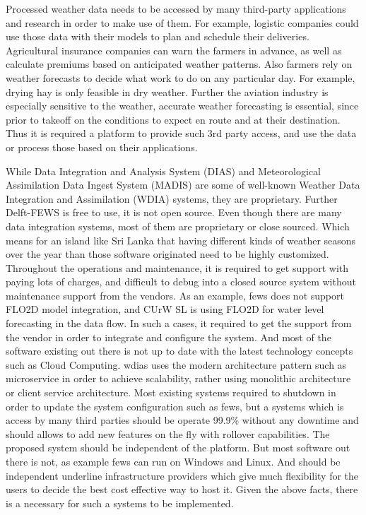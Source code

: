 Processed weather data needs to be accessed by many third-party applications and research in order to make use of them. For example, logistic companies could use those data with their models to plan and schedule their deliveries. Agricultural insurance companies can warn the farmers in advance, as well as calculate premiums based on anticipated weather patterns. Also farmers rely on weather forecasts to decide what work to do on any particular day. For example, drying hay is only feasible in dry weather. Further the aviation industry is especially sensitive to the weather, accurate weather forecasting is essential, since prior to takeoff on the conditions to expect en route and at their destination. 
Thus it is required a platform to provide such 3rd party access, and use the data or process those based on their applications.

While Data Integration and Analysis System (DIAS) and Meteorological Assimilation Data Ingest System (MADIS) are some of well-known Weather Data Integration and Assimilation (WDIA) systems, they are proprietary. Further Delft-FEWS is free to use, it is not open source.
Even though there are many data integration systems, most of them are proprietary or close sourced. Which means for an island like Sri Lanka that having different kinds of weather seasons over the year than those software originated need to be highly customized. Throughout the operations and maintenance, it is required to get support with paying lots of charges, and difficult to debug into a closed source system without maintenance support from the vendors. As an example, \acrshort{fews} does not support FLO2D model integration, and CUrW SL is using FLO2D for water level forecasting in the data flow. In such a cases, it required to get the support from the vendor in order to integrate and configure the system.
And most of the software existing out there is not up to date with the latest technology concepts such as Cloud Computing. \acrfull{wdias} uses the modern architecture pattern such as microservice in order to achieve scalability, rather using monolithic architecture or client service architecture. Most existing systems required to shutdown in order to update the system configuration such as \acrshort{fews}, but a systems which is access by many third parties should be operate 99.9\% without any downtime and should allows to add new features on the fly with rollover capabilities. The proposed system should be independent of the platform. But most software out there is not, as example \acrshort{fews} can run on Windows and Linux. And should be independent underline infrastructure providers which give much flexibility for the users to decide the best cost effective way to host it. Given the above facts, there is a necessary for such a systems to be implemented.
